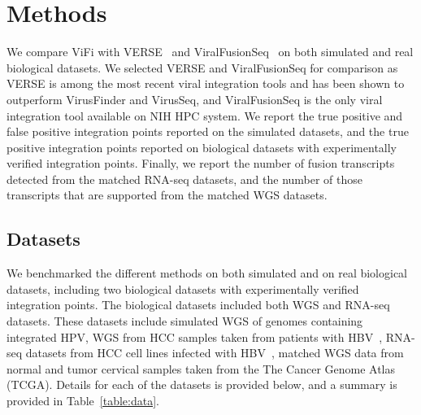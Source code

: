 \documentclass{bioinfo}
\begin{document}

\section{Methods}
We compare ViFi with VERSE~\cite{Wang2015} and ViralFusionSeq~\cite{Li2013} on both simulated and real biological datasets.  We selected VERSE and ViralFusionSeq for comparison as VERSE is among the most recent viral integration tools and has been shown to outperform VirusFinder and VirusSeq, and ViralFusionSeq is the only viral integration tool available on NIH HPC system.  We report the true positive and false positive integration points reported on the simulated datasets, and the true positive integration points reported on biological datasets with experimentally verified integration points.  Finally, we report the number of fusion transcripts detected from the matched RNA-seq datasets, and the number of those transcripts that are supported from the matched WGS datasets.

\subsection{Datasets}
We benchmarked the different methods on both simulated and on real biological datasets, including two biological datasets with experimentally verified integration points.  The biological datasets included both WGS and RNA-seq datasets. These datasets include simulated WGS of genomes containing integrated HPV, WGS from HCC samples taken from patients with HBV~\cite{Sung2012}, RNA-seq datasets from HCC cell lines infected with HBV~\cite{Lau2014}, matched WGS data from normal and tumor cervical samples taken from the The Cancer Genome Atlas (TCGA).  Details for each of the datasets is provided below, and a summary is provided in Table~\ref{table:data}.
\end{document}
